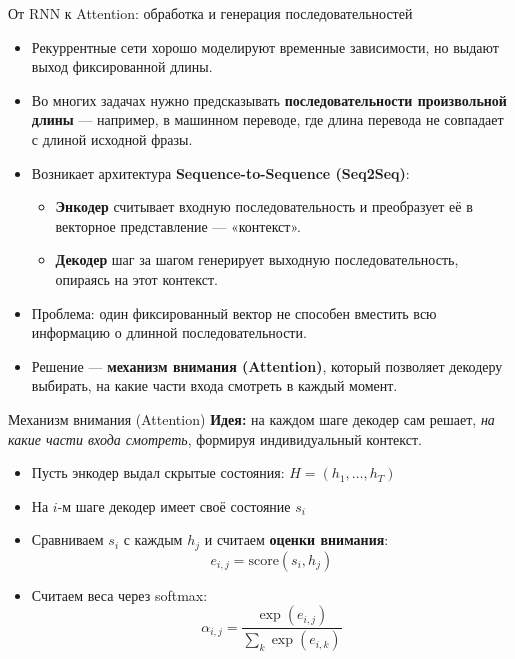 \documentclass[aspectratio=1610,12pt]{beamer}
\begin{document}

\begin{frame}{От RNN к Attention: обработка и генерация последовательностей}
\begin{itemize}
  \item Рекуррентные сети хорошо моделируют временные зависимости, но выдают выход фиксированной длины.
  \item Во многих задачах нужно предсказывать \textbf{последовательности произвольной длины} — например, в машинном переводе, где длина перевода не совпадает с длиной исходной фразы.
  \item Возникает архитектура \textbf{Sequence-to-Sequence (Seq2Seq)}:
  \begin{itemize}
    \item \textbf{Энкодер} считывает входную последовательность и преобразует её в векторное представление — «контекст».
    \item \textbf{Декодер} шаг за шагом генерирует выходную последовательность, опираясь на этот контекст.
  \end{itemize}
  \item Проблема: один фиксированный вектор не способен вместить всю информацию о длинной последовательности.
  \item Решение — \textbf{механизм внимания (Attention)}, который позволяет декодеру выбирать, на какие части входа смотреть в каждый момент.
\end{itemize}
\end{frame}



\begin{frame}{Механизм внимания (Attention)}
\small
\textbf{Идея:} на каждом шаге декодер сам решает, \emph{на какие части входа смотреть}, формируя индивидуальный контекст.

\begin{itemize}
  \item Пусть энкодер выдал скрытые состояния: $H = (h_1, \dots, h_T)$
  \item На $i$-м шаге декодер имеет своё состояние $s_i$
  \item Сравниваем $s_i$ с каждым $h_j$ и считаем \textbf{оценки внимания}:
  \[
  e_{i,j} = \mathrm{score}(s_i, h_j)
  \]
  \item Считаем веса через softmax:
  \[
  \alpha_{i,j} = \frac{\exp(e_{i,j})}{\sum_k \exp(e_{i,k})}
  \]
  \end{itemize}
\end{frame}
\end{document}
